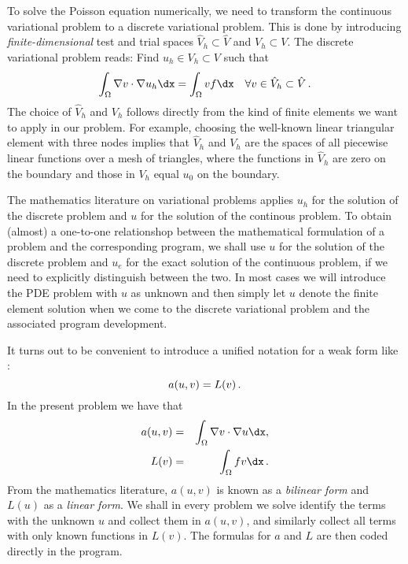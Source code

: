 To solve the Poisson equation numerically, we need to transform the
continuous variational problem 
to a discrete variational
problem. This is done by introducing \emph{finite-dimensional} test and
trial spaces $\hat{V}_h\subset\hat{V}$ and $V_h\subset{V}$. The
discrete variational problem reads: 
Find $u_h \in V_h \subset V$ such that
\begin{equation} \label{langtangen:poisson1:vard}
  \int_{\Omega} \nabla v \cdot \nabla u_h \dx =
  \int_{\Omega} v f \dx
  \quad \forall v \in \hat{V}_h \subset \hat{V}\langtangenep
\end{equation}
The choice of $\hat{V}_h$ and $V_h$ follows directly from the
kind of finite elements we want to apply in our problem. For example,
choosing the well-known linear triangular element with three nodes
implies that
$\hat V_h$ and $V_h$ are the spaces of all piecewise linear functions 
over a mesh of triangles,
where the functions in $\hat V_h$
are zero on the boundary
and those in $V_h$ equal $u_0$ on the boundary.

The mathematics literature on variational problems applies $u_h$ for
the solution of the discrete problem and $u$ for the solution of the
continous problem. To obtain (almost) a one-to-one relationshop between
the mathematical formulation of a problem and the corresponding \fenics{}
program, we shall use $u$ for the solution of the discrete problem
and $u_{e}$ for the exact solution of the continuous problem,
if we need to explicitly distinguish between the two.
In most cases we will introduce the PDE problem with $u$ as unknown and
then simply let $u$ denote the finite element solution when we come
to the discrete variational problem and the associated program development.

It turns out to be convenient to
introduce a unified notation for a weak form
like :
\begin{equation}
a(u, v) = L(v)\thinspace .
\end{equation}
In the present problem we have that
\begin{eqnarray}
a(u, v) &=& \int_{\Omega} \nabla v \cdot \nabla u \dx,
\label{langtangen:poisson1:vard:a}\\
L(v) &=& \int_{\Omega} fv \dx\langtangenep\label{langtangen:poisson1:vard:L}
\end{eqnarray}
From the mathematics literature,
$a(u,v)$ is known as a \emph{bilinear form} and $L(u)$ as a 
\emph{linear form}.
We shall in every problem we solve identify the terms with the
unknown $u$ and collect them in $a(u,v)$, and similarly collect
all terms with only known functions in $L(v)$. The formulas for $a$ and
$L$ are then coded directly in the program.

